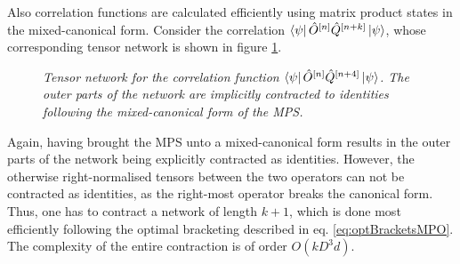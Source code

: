Also correlation functions are calculated efficiently using matrix product states in the mixed-canonical form. Consider the correlation $\bra{\psi} \hat{O}^{[n]} \hat{Q}^{[n+k]} \ket{\psi}$, whose corresponding tensor network is shown in figure \ref{fig:CorrelationFunction}.
\begin{figure}[h!]
	\centering
	
	\caption{\textit{Tensor network for the correlation function $\bra{\psi} \hat{O}^{[n]} \hat{Q}^{[n+4]} \ket{\psi}$. The outer parts of the network are implicitly contracted to identities following the mixed-canonical form of the MPS.}}
	\label{fig:CorrelationFunction}
\end{figure}
Again, having brought the MPS unto a mixed-canonical form results in the outer parts of the network being explicitly contracted as identities. However, the otherwise right-normalised tensors between the two operators can not be contracted as identities, as the right-most operator breaks the canonical form. Thus, one has to contract a network of length $k+1$, which is done most efficiently following the optimal bracketing described in eq. \eqref{eq:optBracketsMPO}. The complexity of the entire contraction is of order $O(k D^3 d)$.

